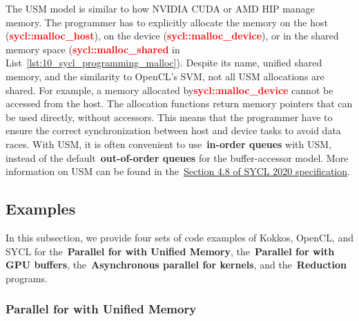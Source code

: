 \par
The USM model is similar to how NVIDIA CUDA or AMD HIP manage memory.
The programmer has to explicitly allocate the memory on the host (\textbf{\textcolor{red}{sycl::malloc\_host}}), on the device (\textbf{\textcolor{red}{sycl::malloc\_device}}), or in the shared memory space (\textbf{\textcolor{red}{sycl::malloc\_shared}} in List~\ref{lst:10_sycl_programming_malloc}).
Despite its name, unified shared memory, and the similarity to OpenCL’s SVM, not all USM allocations are shared.
For example, a memory allocated by\textbf{\textcolor{red}{sycl::malloc\_device}} cannot be accessed from the host.
The allocation functions return memory pointers that can be used directly, without accessors.
This means that the programmer have to ensure the correct synchronization between host and device tasks to avoid data races.
With USM, it is often convenient to use~\textbf{in-order queues} with USM, instead of the default~\textbf{out-of-order queues} for the buffer-accessor model.
More information on USM can be found in the~\href{https://registry.khronos.org/SYCL/specs/sycl-2020/html/sycl-2020.html#sec:usm}{Section 4.8 of SYCL 2020 specification}.







\subsection{Examples}


\par
In this subsection, we provide four sets of code examples of Kokkos, OpenCL, and SYCL for the~\textbf{Parallel for with Unified Memory}, the~\textbf{Parallel for with GPU buffers}, the~\textbf{Asynchronous parallel for kernels}, and the~\textbf{Reduction} programs.


\subsubsection{Parallel for with Unified Memory}





